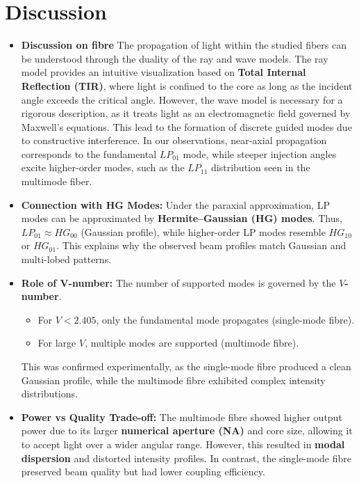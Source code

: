 \section{Discussion}
\label{sec:discussion}

\begin{itemize}

\item \textbf{Discussion on fibre}  
The propagation of light within the studied fibers can be understood through the duality of the ray and wave models. The ray model provides an intuitive visualization based on \textbf{Total Internal Reflection (TIR)}, where light is confined to the core as long as the incident angle exceeds the critical angle. However, the wave model is necessary for a rigorous description, as it treats light as an electromagnetic field governed by Maxwell’s equations. This lead to the formation of discrete guided modes due to constructive interference. In our observations, near-axial propagation corresponds to the fundamental $LP_{01}$ mode, while steeper injection angles excite higher-order modes, such as the $LP_{11}$ distribution seen in the multimode fiber.

\item \textbf{Connection with HG Modes:}  
Under the paraxial approximation, LP modes can be approximated by \textbf{Hermite--Gaussian (HG) modes}. Thus, $LP_{01} \approx HG_{00}$ (Gaussian profile), while higher-order LP modes resemble $HG_{10}$ or $HG_{01}$. This explains why the observed beam profiles match Gaussian and multi-lobed patterns.

\item \textbf{Role of V-number:}  
The number of supported modes is governed by the \textbf{$V$-number}.  
\begin{itemize}
    \item For $V < 2.405$, only the fundamental mode propagates (single-mode fibre).
    \item For large $V$, multiple modes are supported (multimode fibre).
\end{itemize}
This was confirmed experimentally, as the single-mode fibre produced a clean Gaussian profile, while the multimode fibre exhibited complex intensity distributions.

\item \textbf{Power vs Quality Trade-off:}  
The multimode fibre showed higher output power due to its larger \textbf{numerical aperture (NA)} and core size, allowing it to accept light over a wider angular range. However, this resulted in \textbf{modal dispersion} and distorted intensity profiles. In contrast, the single-mode fibre preserved beam quality but had lower coupling efficiency.


\end{itemize}
